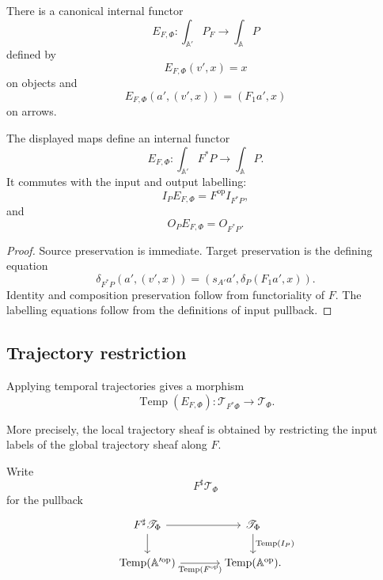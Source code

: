 There is a canonical internal functor
\[
    E_{F,\Phi}:
    \int_{\mathbb A'}P_F
    \to
    \int_{\mathbb A}P
\]
defined by
\[
    E_{F,\Phi}(v',x)=x
\]
on objects and
\[
    E_{F,\Phi}(a',(v',x))
    =
    (F_1a',x)
\]
on arrows.

\begin{proposition}
\label{prop:execution-restriction-functor}
The displayed maps define an internal functor
\[
    E_{F,\Phi}:
    \int_{\mathbb A'}F^\ast P
    \to
    \int_{\mathbb A}P.
\]
It commutes with the input and output labelling:
\[
    I_P E_{F,\Phi}
    =
    F^{\mathrm{op}}I_{F^\ast P},
\]
and
\[
    O_P E_{F,\Phi}
    =
    O_{F^\ast P}.
\]
\end{proposition}

\begin{proof}
Source preservation is immediate. Target preservation is the defining
equation
\[
    \delta_{F^\ast P}(a',(v',x))
    =
    \left(
    s_{A'}a',
    \delta_P(F_1a',x)
    \right).
\]
Identity and composition preservation follow from functoriality of \(F\).
The labelling equations follow from the definitions of input pullback.
\end{proof}

\subsection{Trajectory restriction}
\label{subsec:trajectory-restriction-input}

Applying temporal trajectories gives a morphism
\[
    \operatorname{Temp}(E_{F,\Phi}):
    \mathscr T_{F^\ast\Phi}
    \to
    \mathscr T_\Phi.
\]

More precisely, the local trajectory sheaf is obtained by restricting the
input labels of the global trajectory sheaf along \(F\).

\begin{definition}
\label{def:interface-restriction-trajectory-semantics}
Write
\[
    F^\sharp\mathscr T_\Phi
\]
for the pullback
\[
\begin{tikzcd}[column sep=large]
    F^\sharp\mathscr T_\Phi
        \arrow[r]
        \arrow[d]
    &
    \mathscr T_\Phi
        \arrow[d, "\operatorname{Temp}(I_P)"]
    \\
    \operatorname{Temp}(\mathbb A'^{\mathrm{op}})
        \arrow[r, "\operatorname{Temp}(F^{\mathrm{op}})"']
    &
    \operatorname{Temp}(\mathbb A^{\mathrm{op}}).
\end{tikzcd}
\]
\end{definition}


